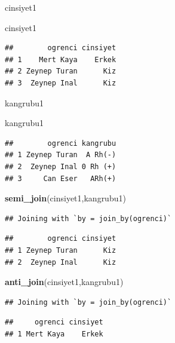 \documentclass[
  oneside]{book}
\newenvironment{Shaded}{\begin{snugshade}}{\end{snugshade}}
\newcommand{\FunctionTok}[1]{\textcolor[rgb]{0.13,0.29,0.53}{\textbf{#1}}}
\newcommand{\NormalTok}[1]{#1}
\begin{document}
cinsiyet1

\begin{Shaded}
\begin{Highlighting}[]
\NormalTok{cinsiyet1}
\end{Highlighting}
\end{Shaded}

\begin{verbatim}
##        ogrenci cinsiyet
## 1    Mert Kaya    Erkek
## 2 Zeynep Turan      Kiz
## 3  Zeynep Inal      Kiz
\end{verbatim}

kangrubu1

\begin{Shaded}
\begin{Highlighting}[]
\NormalTok{kangrubu1}
\end{Highlighting}
\end{Shaded}

\begin{verbatim}
##        ogrenci kangrubu
## 1 Zeynep Turan  A Rh(-)
## 2  Zeynep Inal 0 Rh (+)
## 3     Can Eser   ARh(+)
\end{verbatim}

\begin{Shaded}
\begin{Highlighting}[]
\FunctionTok{semi\_join}\NormalTok{(cinsiyet1,kangrubu1)}
\end{Highlighting}
\end{Shaded}

\begin{verbatim}
## Joining with `by = join_by(ogrenci)`
\end{verbatim}

\begin{verbatim}
##        ogrenci cinsiyet
## 1 Zeynep Turan      Kiz
## 2  Zeynep Inal      Kiz
\end{verbatim}

\begin{Shaded}
\begin{Highlighting}[]
\FunctionTok{anti\_join}\NormalTok{(cinsiyet1,kangrubu1)}
\end{Highlighting}
\end{Shaded}

\begin{verbatim}
## Joining with `by = join_by(ogrenci)`
\end{verbatim}

\begin{verbatim}
##     ogrenci cinsiyet
## 1 Mert Kaya    Erkek
\end{verbatim}
\end{document}

